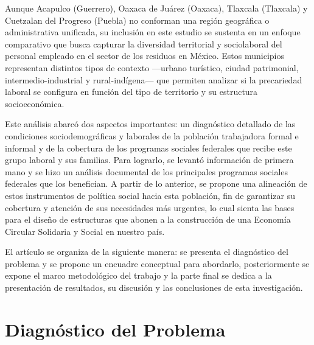 \documentclass[
  spanish,
  11.5pt,
  170mm x 240mmpaper,
]{scrbook}
\begin{document}
Aunque Acapulco (Guerrero), Oaxaca de Juárez (Oaxaca), Tlaxcala
(Tlaxcala) y Cuetzalan del Progreso (Puebla) no conforman una región
geográfica o administrativa unificada, su inclusión en este estudio se
sustenta en un enfoque comparativo que busca capturar la diversidad
territorial y sociolaboral del personal empleado en el sector de los
residuos en México. Estos municipios representan distintos tipos de
contexto ---urbano turístico, ciudad patrimonial, intermedio-industrial
y rural-indígena--- que permiten analizar si la precariedad laboral se
configura en función del tipo de territorio y su estructura
socioeconómica.

Este análisis abarcó dos aspectos importantes: un diagnóstico detallado
de las condiciones sociodemográficas y laborales de la población
trabajadora formal e informal y de la cobertura de los programas
sociales federales que recibe este grupo laboral y sus familias. Para
lograrlo, se levantó información de primera mano y se hizo un análisis
documental de los principales programas sociales federales que los
benefician. A partir de lo anterior, se propone una alineación de estos
instrumentos de política social hacia esta población, fin de garantizar
su cobertura y atención de sus necesidades más urgentes, lo cual sienta
las bases para el diseño de estructuras que abonen a la construcción de
una Economía Circular Solidaria y Social en nuestro país.

El artículo se organiza de la siguiente manera: se presenta el
diagnóstico del problema y se propone un encuadre conceptual para
abordarlo, posteriormente se expone el marco metodológico del trabajo y
la parte final se dedica a la presentación de resultados, su discusión y
las conclusiones de esta investigación.


\chapter{Diagnóstico del Problema}\label{diagnuxf3stico-del-problema}
\end{document}
